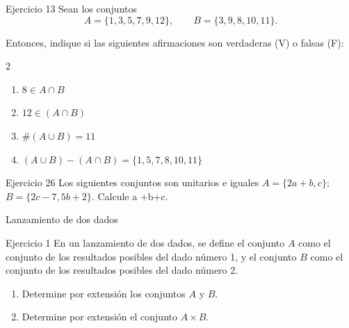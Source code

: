 \documentclass[aspectratio=169]{beamer}
\begin{document}
\begin{frame}[t]{}

	\begin{block}{Ejercicio 13}
		\Large
		Sean los conjuntos
		\[
			A=\{1,3,5,7,9,12\}, \qquad B=\{3,9,8,10,11\}.
		\]

		Entonces, indique si las siguientes afirmaciones son verdaderas (V) o falsas (F):
		\begin{multicols}{2}
			\begin{enumerate}
				\item $8\in A\cap B$
				\item $12\in (A\cap B)$
				\item $\#(A\cup B)=11$
				\item $(A\cup B)-(A\cap B)=\{1,5,7,8,10,11\}$
			\end{enumerate}
		\end{multicols}
	\end{block}
\end{frame}

\begin{frame}[t]{}
	\begin{block}{Ejercicio 26}
		\Large
		Los siguientes conjuntos son unitarios e iguales
		$A = \{2a+b, c\}$;
		$B = \{2c -7, 5b+2\}$.
		Calcule a +b+c.
	\end{block}
\end{frame}

\begin{frame}[t]{Lanzamiento de dos dados}
	\begin{block}{Ejercicio 1}
		En un lanzamiento de dos dados, se define el conjunto $A$ como el conjunto de los resultados posibles del dado número 1, y el conjunto $B$ como el conjunto de los resultados posibles del dado número 2.

		\begin{enumerate}
			\item Determine por extensión los conjuntos $A$ y $B$.
			\item Determine por extensión el conjunto $A\times B$.
		\end{enumerate}
	\end{block}
\end{frame}
\end{document}

